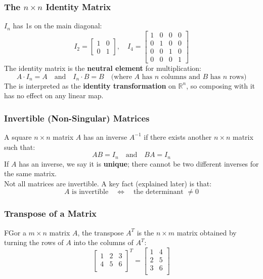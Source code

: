 \documentclass[a4paper, 9pt]{extarticle}
\begin{document}
\subsubsection*{The $n \times n$ Identity Matrix}
$I_n$ has 1s on the main diagonal:
$$I_2 =
  \begin{bmatrix}
    1 & 0 \\
    0 & 1
  \end{bmatrix}, \quad
  I_4 =
  \begin{bmatrix}
    1 & 0 & 0 & 0 \\
    0 & 1 & 0 & 0 \\
    0 & 0 & 1 & 0 \\
    0 & 0 & 0 & 1
  \end{bmatrix}
$$
The identity matrix is the \textbf{neutral element} for multiplication:
$$
  A \cdot I_n = A \quad \text{and} \quad I_n \cdot B = B \quad \text{(where $A$ has $n$ columns and $B$ has $n$ rows)}
$$
The is interpreted as the \textbf{identity transformation} on $\mathbb{R}^n$, so composing with it has no effect on any linear map.
\subsubsection*{Invertible (Non-Singular) Matrices}
A square $n \times n$ matrix $A$ has an inverse $A^{-1}$ if there exists another $n \times n$ matrix such that:
$$AB = I_n \quad \text{and} \quad BA = I_n$$
If $A$ has an inverse, we say it is \textbf{unique}; there cannot be two different inverses for the same matrix. \\[2ex]
Not all matrices are invertible. A key fact (explained later) is that:
$$A \text{ is invertible} \quad \Leftrightarrow \quad \text{the determinant $\neq 0$}$$
\subsubsection*{Transpose of a Matrix}
FGor a $m \times n$ matrix $A$, the transpose $A^T$ is the $n \times m$ matrix obtained by turning the rows of $A$ into the columns of $A^T$:
$$
  \begin{bmatrix}
    1 & 2 & 3 \\
    4 & 5 & 6 \\
  \end{bmatrix}^T =
  \begin{bmatrix}
    1 & 4 \\
    2 & 5 \\
    3 & 6 \\
  \end{bmatrix}
$$
\end{document}
